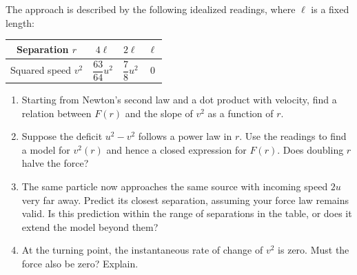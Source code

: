 \documentclass[11pt,a4paper]{article}
\begin{document}
The approach is described by the following idealized readings, where
$\ell$ is a fixed length:
\begin{center}
\renewcommand{\arraystretch}{1.5}
\begin{tabular}{c|ccc}
Separation $r$ & $4\ell$ & $2\ell$ & $\ell$ \\
\hline
Squared speed $v^2$ & $\dfrac{63}{64}u^2$ & $\dfrac78u^2$ & $0$
\end{tabular}
\end{center}

\begin{enumerate}[label=\alph*)]
  \item Starting from Newton's second law and a dot product with velocity,
    find a relation between $F(r)$ and the slope of $v^2$ as a function of $r$.
  \item Suppose the deficit $u^2-v^2$ follows a power law in $r$.
    Use the readings to find a model for $v^2(r)$ and hence a closed
    expression for $F(r)$. Does doubling $r$ halve the force?
  \item The same particle now approaches the same source with incoming
    speed $2u$ very far away. Predict its closest separation, assuming
    your force law remains valid. Is this prediction within the range
    of separations in the table, or does it extend the model beyond them?
  \item At the turning point, the instantaneous rate of change of
    $v^2$ is zero. Must the force also be zero? Explain.
\end{enumerate}

\end{document}
